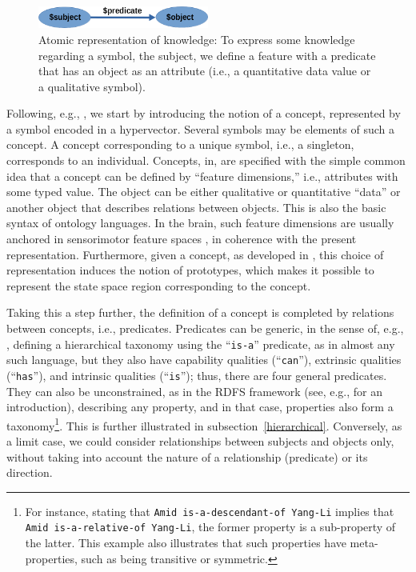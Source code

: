 \documentclass[sn-mathphys]{sn-jnl}
\begin{document}
\begin{figure}[htbp]
\centerline{\includegraphics[width=0.5\textwidth]{./triple.png}}
\caption{Atomic representation of knowledge: To express some knowledge regarding a symbol, the subject, we define a feature with a predicate that has an object as an attribute (i.e., a quantitative data value or a qualitative symbol).}
\label{triple}
\end{figure}

Following, e.g., \cite{gardenfors_conceptual_2004}, we start by introducing the notion of a concept, represented by a symbol encoded in a hypervector. Several symbols may be elements of such a concept. A concept corresponding to a unique symbol, i.e., a singleton, corresponds to an individual. Concepts, in, \cite{gardenfors_conceptual_2004} are specified with the simple common idea that a concept can be defined by ``feature dimensions,'' i.e., attributes with some typed value. The object can be either qualitative or quantitative ``data'' or another object that describes relations between objects. This is also the basic syntax of ontology languages. In the brain, such feature dimensions are usually anchored in sensorimotor feature spaces \cite{freksa_strong_2015}, in coherence with the present representation. Furthermore, given a concept, as developed in \cite{gardenfors_conceptual_2004}, this choice of representation induces the notion of prototypes, which makes it possible to represent the state space region corresponding to the concept.

Taking this a step further, the definition of a concept is completed by relations between concepts, i.e., predicates. Predicates can be generic, in the sense of, e.g., \cite{mcclelland_parallel_2003}, defining a hierarchical taxonomy using the ``{\tt is-a}'' predicate, as in almost any such language, but they also have capability qualities (``{\tt can}''), extrinsic qualities (``{\tt has}''), and intrinsic qualities (``{\tt is}''); thus, there are four general predicates. They can also be unconstrained, as in the RDFS framework (see, e.g., \cite{noy_ontology_2001} for an introduction), describing any property, and in that case, properties also form a taxonomy\footnote{For instance, stating that {\tt Amid is-a-descendant-of Yang-Li} implies that {\tt Amid is-a-relative-of Yang-Li}, the former property is a sub-property of the latter. This example also illustrates that such properties have meta-properties, such as being transitive or symmetric.}. This is further illustrated in subsection~\ref{hierarchical}. Conversely, as a limit case, we could consider relationships between subjects and objects only, without taking into account the nature of a relationship (predicate) or its direction.
\end{document}
